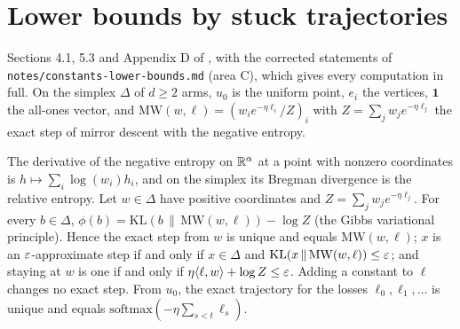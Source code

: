 \chapter{Lower bounds by stuck trajectories}
\label{chap:entropy_lower}

Sections 4.1, 5.3 and Appendix D of \cite{SSKM26}, with the corrected statements of
\texttt{notes/constants-lower-bounds.md} (area C), which gives every computation in full. On the
simplex $\Delta$ of $d \ge 2$ arms, $u_0$ is the uniform point, $e_i$ the vertices, $\mathbf{1}$ the
all-ones vector, and $\mathrm{MW}(w, \ell) = (w_i e^{-\eta\ell_i}/Z)_i$ with
$Z = \sum_j w_j e^{-\eta\ell_j}$ the exact step of mirror descent with the negative entropy.

\begin{lemma}
  \label{lem:mw_exact}
  \leanok
  The derivative of the negative entropy on $\mathbb{R}^\alpha$ at a point with nonzero coordinates is
  $h \mapsto \sum_i \log(w_i) h_i$, and on the simplex its Bregman divergence is the relative
  entropy. Let $w \in \Delta$ have positive coordinates and $Z = \sum_j w_j e^{-\eta\ell_j}$. For
  every $b \in \Delta$, $\phi(b) = \mathrm{KL}(b \,\|\, \mathrm{MW}(w, \ell)) - \log Z$ (the Gibbs
  variational principle). Hence the exact step from $w$ is unique and equals $\mathrm{MW}(w, \ell)$;
  $x$ is an $\varepsilon$-approximate step if and only if $x \in \Delta$ and
  $\mathrm{KL}(x \,\|\, \mathrm{MW}(w, \ell)) \le \varepsilon$; and staying at $w$ is one if and only if
  $\eta\langle \ell, w \rangle + \log Z \le \varepsilon$. Adding a constant to $\ell$ changes no exact step. From
  $u_0$, the exact trajectory for the losses $\ell_0, \ell_1, \dots$ is unique and equals
  $\mathrm{softmax}(-\eta\sum_{s < t}\ell_s)$.
\end{lemma}

